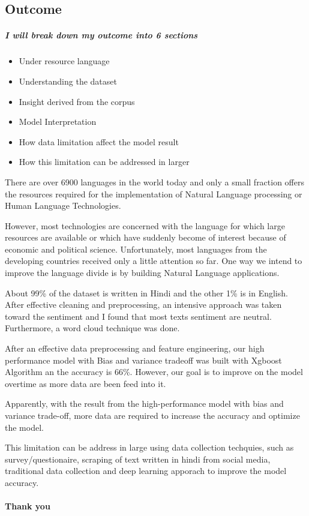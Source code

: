 \documentclass[11pt]{article}
\providecommand{\tightlist}{%
      \setlength{\itemsep}{0pt}\setlength{\parskip}{0pt}}
\begin{document}
    \subsection{Outcome}\label{outcome}

    \subparagraph{I will break down my outcome into 6
sections}\label{i-will-break-down-my-outcome-into-6-sections}

\begin{itemize}
\tightlist
\item
  Under resource language
\item
  Understanding the dataset
\item
  Insight derived from the corpus
\item
  Model Interpretation
\item
  How data limitation affect the model result
\item
  How this limitation can be addressed in larger
\end{itemize}

    There are over 6900 languages in the world today and only a small
fraction offers the resources required for the implementation of Natural
Language processing or Human Language Technologies.

However, most technologies are concerned with the language for which
large resources are available or which have suddenly become of interest
because of economic and political science. Unfortunately, most languages
from the developing countries received only a little attention so far.
One way we intend to improve the language divide is by building Natural
Language applications.

    About 99\% of the dataset is written in Hindi and the other 1\% is in
English. After effective cleaning and preprocessing, an intensive
approach was taken toward the sentiment and I found that most texts
sentiment are neutral. Furthermore, a word cloud technique was done.

    After an effective data preprocessing and feature engineering, our high
performance model with Bias and variance tradeoff was built with Xgboost
Algorithm an the accuracy is 66\%. However, our goal is to improve on
the model overtime as more data are been feed into it.

    Apparently, with the result from the high-performance model with bias
and variance trade-off, more data are required to increase the accuracy
and optimize the model.

    This limitation can be address in large using data collection techquies,
such as survey/questionaire, scraping of text written in hindi from
social media, traditional data collection and deep learning apporach to
improve the model accuracy.

    \paragraph{Thank you}\label{thank-you}


    
    
    
    
\end{document}
